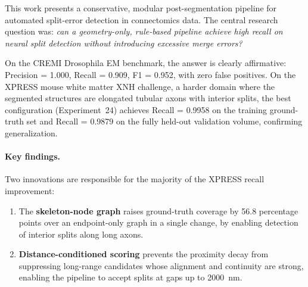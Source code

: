 This work presents a conservative, modular post-segmentation pipeline for
automated split-error detection in connectomics data. The central research
question was: \emph{can a geometry-only, rule-based pipeline achieve high recall
on neural split detection without introducing excessive merge errors?}

On the CREMI Drosophila EM benchmark, the answer is clearly affirmative:
Precision = 1.000, Recall = 0.909, F1 = 0.952, with zero false positives. On
the XPRESS mouse white matter XNH challenge, a harder domain where the
segmented structures are elongated tubular axons with interior splits, the
best configuration (Experiment~24) achieves Recall = 0.9958 on the training
ground-truth set and Recall = 0.9879 on the fully held-out validation volume,
confirming generalization.

\paragraph{Key findings.}
Two innovations are responsible for the majority of the XPRESS recall improvement:

\begin{enumerate}
  \item The \textbf{skeleton-node graph} raises ground-truth coverage by 56.8
        percentage points over an endpoint-only graph in a single change, by
        enabling detection of interior splits along long axons.

  \item \textbf{Distance-conditioned scoring} prevents the proximity decay from
        suppressing long-range candidates whose alignment and continuity are
        strong, enabling the pipeline to accept splits at gaps up to 2000~nm.
\end{enumerate}

